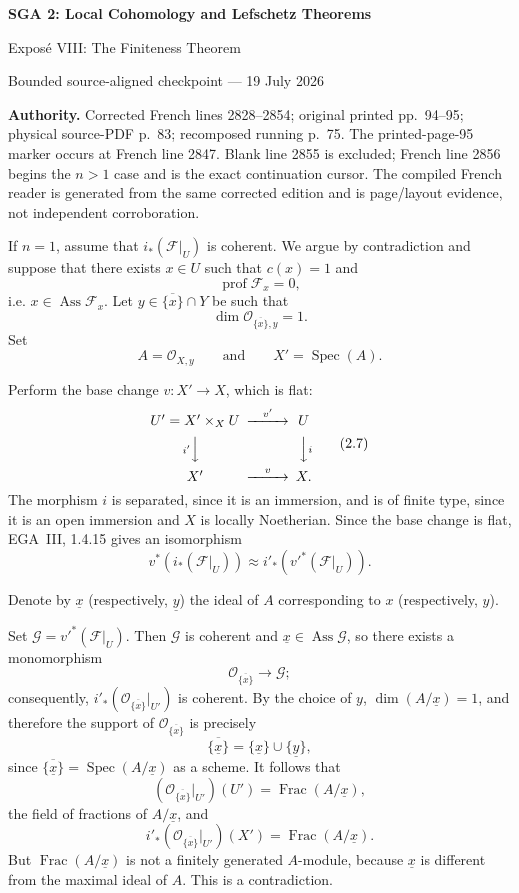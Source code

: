 \documentclass[10pt,a4paper]{article}
\newcommand{\cF}{\mathcal F}
\newcommand{\cG}{\mathcal G}
\newcommand{\cO}{\mathcal O}
\newcommand{\prof}{\operatorname{prof}}
\newcommand{\Ass}{\operatorname{Ass}}
\newcommand{\Spec}{\operatorname{Spec}}
\newcommand{\Frac}{\operatorname{Frac}}
\begin{document}
\begin{center}
  {\Large\bfseries SGA 2: Local Cohomology and Lefschetz Theorems}\par\smallskip
  {\large Expos\'e VIII: The Finiteness Theorem}\par
  \small Bounded source-aligned checkpoint --- 19 July 2026
\end{center}
\noindent\colorbox{softgray}{\parbox{0.95\linewidth}{\footnotesize\textbf{Authority.}
Corrected French lines 2828--2854; original printed pp.~94--95; physical
source-PDF p.~83; recomposed running p.~75. The printed-page-95 marker occurs
at French line 2847. Blank line 2855 is excluded; French line 2856 begins the
$n>1$ case and is the exact continuation cursor. The compiled French reader
is generated from the same corrected edition and is page/layout evidence,
not independent corroboration.}}

\medskip
\noindent If $n=1$, assume that $i_*(\cF|_U)$ is coherent. We argue by
contradiction and suppose that there exists $x\in U$ such that $c(x)=1$ and
\[
  \prof\cF_x=0,
\]
i.e. $x\in\Ass\cF_x$. Let $y\in\overline{\{x\}}\cap Y$ be such that
\[
  \dim\cO_{\overline{\{x\}},y}=1.
\]
Set
\[
  A=\cO_{X,y}\qquad\text{and}\qquad X'=\Spec(A).
\]

\setcounter{equation}{6}
\noindent Perform the base change $v\colon X'\longrightarrow X$, which is
flat:
\begin{equation}
\begin{CD}
U'=X'\times_X U @>{v'}>> U\\
@V{i'}VV @VV{i}V\\
X' @>{v}>> X .
\end{CD}
\tag{2.7}\label{eq:VIII.2.7}
\end{equation}
The morphism $i$ is separated, since it is an immersion, and is of finite
type, since it is an open immersion and $X$ is locally Noetherian. Since the
base change is flat, EGA~III, 1.4.15 gives an isomorphism
\begin{equation}
  v^*(i_*(\cF|_U))
  \approx
  i'_*(v'^*(\cF|_U)).
\tag{2.8}\label{eq:VIII.2.8}
\end{equation}

\quad Denote by
$\underline{x}$ (respectively, $\underline{y}$) the ideal of $A$
corresponding to $x$ (respectively, $y$).

\medskip
\noindent Set $\cG=v'^*(\cF|_U)$. Then $\cG$ is coherent and
$\underline{x}\in\Ass\cG$, so there exists a monomorphism
\[
  \cO_{\overline{\{x\}}}\longrightarrow\cG;
\]
consequently, $i'_*(\cO_{\overline{\{x\}}}|_{U'})$ is coherent. By the choice
of $y$, $\dim(A/\underline{x})=1$, and therefore the support of
$\cO_{\overline{\{x\}}}$ is precisely
\[
  \overline{\{\underline{x}\}}
  =\{\underline{x}\}\cup\{\underline{y}\},
\]
since $\overline{\{\underline{x}\}}=\Spec(A/\underline{x})$ as a scheme. It
follows that
\[
  (\cO_{\overline{\{x\}}}|_{U'})(U')
  =\Frac(A/\underline{x}),
\]
the field of fractions of $A/\underline{x}$, and
\[
  i'_*(\cO_{\overline{\{x\}}}|_{U'})(X')
  =\Frac(A/\underline{x}).
\]
But $\Frac(A/\underline{x})$ is not a finitely generated $A$-module, because
$\underline{x}$ is different from the maximal ideal of $A$. This is a
contradiction.
\end{document}

